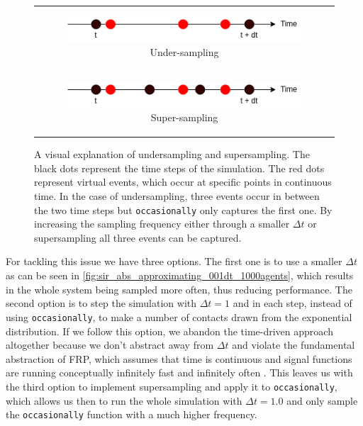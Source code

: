 \begin{figure}
\begin{center}
	\begin{tabular}{c}
		\begin{subfigure}[b]{0.5\textwidth}
			\centering
			\includegraphics[width=1\textwidth, angle=0]{./fig/timedriven/undersampling.png}
			\caption{Under-sampling}
			\label{fig:undersampling}
		\end{subfigure}
		
		\\
		
		\begin{subfigure}[b]{0.5\textwidth}
			\centering
			\includegraphics[width=1\textwidth, angle=0]{./fig/timedriven/supersampling.png}
			\caption{Super-sampling}
			\label{fig:supersampling}
		\end{subfigure}
	\end{tabular}
	
	\caption{A visual explanation of undersampling and supersampling. The black dots represent the time steps of the simulation. The red dots represent virtual events, which occur at specific points in continuous time. In the case of undersampling, three events occur in between the two time steps but \texttt{occasionally} only captures the first one. By increasing the sampling frequency either through a smaller $\Delta t$ or supersampling all three events can be captured.} 
	\label{fig:sampling_issue}
\end{center}
\end{figure}

For tackling this issue we have three options. The first one is to use a smaller $\Delta t$ as can be seen in \ref{fig:sir_abs_approximating_001dt_1000agents}, which results in the whole system being sampled more often, thus reducing performance. The second option is to step the simulation with $\Delta t = 1$ and in each step, instead of using \texttt{occasionally}, to make a number of contacts drawn from the exponential distribution. If we follow this option, we abandon the time-driven approach altogether because we don't abstract away from $\Delta t$ and violate the fundamental abstraction of FRP, which assumes that time is continuous and signal functions are running conceptually infinitely fast and infinitely often \cite{winograd-cort_wormholes:_2012}. This leaves us with the third option to implement supersampling and apply it to \texttt{occasionally}, which allows us then to run the whole simulation with $\Delta t = 1.0$ and only sample the \texttt{occasionally} function with a much higher frequency.

